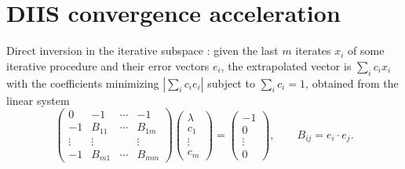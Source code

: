 \section{DIIS convergence acceleration}\label{sec:iterative:diis}


Direct inversion in the iterative subspace \cite{iterative:pulay1980,iterative:pulay1982}: given the last $m$ iterates $x_i$ of
some iterative procedure and their error vectors $e_i$, the extrapolated vector is $\sum_ic_ix_i$ with the coefficients
minimizing $|\sum_ic_ie_i|$ subject to $\sum_ic_i=1$, obtained from the linear system
\begin{equation}\label{eq:iterative:diis}
\begin{pmatrix}0&-1&\cdots&-1\\-1&B_{11}&\cdots&B_{1m}\\\vdots&\vdots&&\vdots\\-1&B_{m1}&\cdots&B_{mm}\end{pmatrix}
\begin{pmatrix}\lambda\\c_1\\\vdots\\c_m\end{pmatrix}=\begin{pmatrix}-1\\0\\\vdots\\0\end{pmatrix},\qquad B_{ij}=e_i\cdot e_j .
\end{equation}

